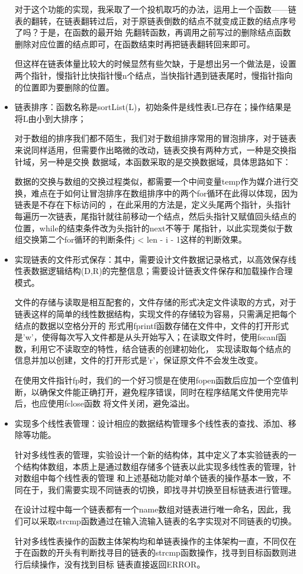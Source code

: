\documentclass[supercite]{Experimental_Report}
\theoremstyle{definition}
\begin{document}
\begin{itemize}
	      对于这个功能的实现，我采取了一个投机取巧的办法，运用上一个函数——链表的翻转，在链表翻转过后，对于原链表倒数的结点不就变成正数的结点序号了吗？于是，在函数的最开始
	      先翻转函数，再调用之前写过的删除结点函数删除对应位置的结点即可，在函数结束时再把链表翻转回来即可。

	      但这样在链表体量比较大的时候显然有些欠缺，于是想出另一个做法是，设置两个指针，慢指针比快指针慢n个结点，当快指针遇到链表尾时，慢指针指向的位置即为要删除的位置。
	\item 链表排序：函数名称是sortList(L)，初始条件是线性表L已存在；操作结果是将L由小到大排序；

	      对于数组的排序我们都不陌生，我们对于数组排序常用的冒泡排序，对于链表来说同样适用，但需要作出略微的改动，链表交换有两种方式，一种是交换指针域，另一种是交换
	      数据域，本函数采取的是交换数据域，具体思路如下：

	      数据的交换与数组的交换过程类似，都需要一个中间变量temp作为媒介进行交换，难点在于如何让冒泡排序在数组排序中的两个for循环在此得以体现，因为链表是不存在下标访问的
	      ，在此采用的方法是，定义头尾两个指针，头指针每遍历一次链表，尾指针就往前移动一个结点，然后头指针又赋值回头结点的位置，while的结束条件改为头指针的next不等于
	      尾指针，以此实现类似于数组交换第二个for循环的判断条件j < len - i - 1这样的判断效果。
	\item 实现链表的文件形式保存：其中，需要设计文件数据记录格式，以高效保存线性表数据逻辑结构(D,{R})的完整信息；需要设计链表文件保存和加载操作合理模式。

	      文件的存储与读取是相互配套的，文件存储的形式决定文件读取的方式，对于链表这样的简单的线性数据结构，实现文件的存储较为容易，只需满足把每个结点的数据以空格分开的
	      形式用fprintf函数存储在文件中，文件的打开形式是'w'，使得每次写入文件都是从头开始写入；在读取文件时，使用fscanf函数，利用它不读取空的特性，结合链表的创建初始化，
	      实现读取每个结点的信息并加以创建，文件的打开形式是'r'，保证原文件不会发生改变。

	      在使用文件指针fp时，我们的一个好习惯是在使用fopen函数后应加一个空值判断，以确保文件能正确打开，避免程序错误，同时在程序结尾文件使用完毕后，也应使用fclose函数
	      将文件关闭，避免溢出。
	\item 实现多个线性表管理：设计相应的数据结构管理多个线性表的查找、添加、移除等功能。

	      针对多线性表的管理，实验设计一个新的结构体，其中定义了本实验链表的一个结构体数组，本质上是通过数组存储多个链表以此实现多线性表的管理，针对数组中每个线性表的管理
	      和上述基础功能对单个链表的操作基本一致，不同在于，我们需要实现不同链表的切换，即找寻并切换至目标链表进行管理。

	      在设计过程中每一个链表都有一个name数组对链表进行唯一命名，因此，我们可以采取strcmp函数通过在输入流输入链表的名字实现对不同链表的切换。

	      针对多线性表操作的函数主体架构均和单链表操作的主体架构一直，不同仅在于在函数的开头有判断找寻目的链表的strcmp函数操作，找寻到目标函数则进行后续操作，没有找到目标
	      链表直接返回ERROR。
\end{itemize}
\newpage
\end{document}
